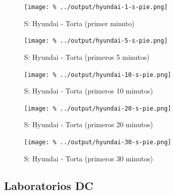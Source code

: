 \documentclass[final,inline,a4paper,narroweqnarray]{ieee}
\begin{document}
    \begin{figure}[H]\begin{center}
      \texttt{[image: \%
      ../output/hyundai-1-s-pie.png]}
      \vspace{-3em}
      \caption{S: Hyundai - Torta (primer minuto)}
      \label{hyundai-1-s-pie}
    \end{center}\end{figure}
    \begin{figure}[H]\begin{center}
      \texttt{[image: \%
      ../output/hyundai-5-s-pie.png]}
      \vspace{-3em}
      \caption{S: Hyundai - Torta (primeros 5 minutos)}
      \label{hyundai-5-s-pie}
    \end{center}\end{figure}
    \begin{figure}[H]\begin{center}
      \texttt{[image: \%
      ../output/hyundai-10-s-pie.png]}
      \vspace{-3em}
      \caption{S: Hyundai - Torta (primeros 10 minutos)}
      \label{hyundai-10-s-pie}
    \end{center}\end{figure}
    \begin{figure}[H]\begin{center}
      \texttt{[image: \%
      ../output/hyundai-20-s-pie.png]}
      \vspace{-3em}
      \caption{S: Hyundai - Torta (primeros 20 minutos)}
      \label{hyundai-20-s-pie}
    \end{center}\end{figure}
    \begin{figure}[H]\begin{center}
      \texttt{[image: \%
      ../output/hyundai-30-s-pie.png]}
      \vspace{-3em}
      \caption{S: Hyundai - Torta (primeros 30 minutos)}
      \label{hyundai-30-s-pie}
    \end{center}\end{figure}

  \subsection{Laboratorios DC}
\end{document}
